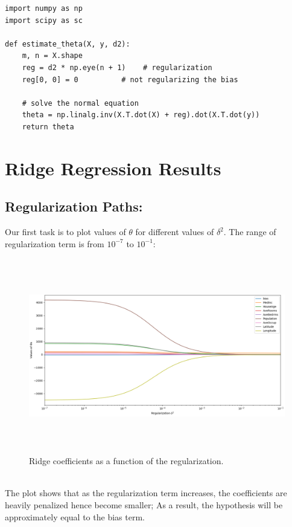\documentclass[a4paper,11pt]{article}
\begin{document}
\begin{verbatim}
import numpy as np
import scipy as sc

def estimate_theta(X, y, d2):
	m, n = X.shape
	reg = d2 * np.eye(n + 1)    # regularization
	reg[0, 0] = 0	       # not regularizing the bias           
	
	# solve the normal equation
	theta = np.linalg.inv(X.T.dot(X) + reg).dot(X.T.dot(y))
	return theta
\end{verbatim}

\section{Ridge Regression Results}
\subsection{\large Regularization Paths:}
Our first task is to plot values of $\theta$ for different values of $\delta^2$. The range of regularization term is from $10^{-7}$ to $10^{-1}$:
\begin{figure}[!htb]
	\centering
	\includegraphics[width=17cm, height=8.5cm]{plotA.png}
	\caption{\small Ridge coefficients as a function of the regularization.}
\end{figure}
\\The plot shows that as the regularization term increases, the coefficients are heavily penalized hence become smaller; As a result, the hypothesis will be approximately equal to the bias term.
\end{document}
